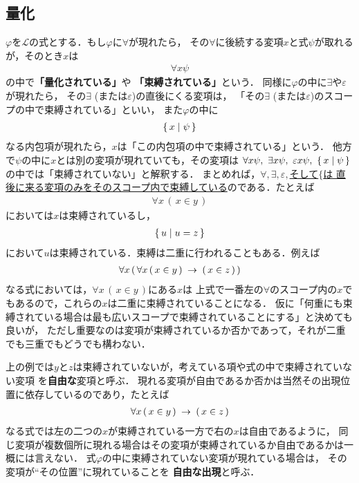 \subsection{量化}
	$\varphi$を$\mathcal{L}$の式とする．もし$\varphi$に$\forall$が現れたら，
	その$\forall$に後続する変項$x$と式$\psi$が取れるが，そのとき$x$は
	\begin{align}
		\forall x \psi
	\end{align}
	の中で{\bf 「量化されている」}や
	{\bf 「束縛されている」}という．
	同様に$\varphi$の中に$\exists$や$\varepsilon$が現れたら，
	その$\exists$ (または$\varepsilon$)の直後にくる変項は，
	「その$\exists$ (または$\varepsilon$)のスコープの中で束縛されている」といい，
	また$\varphi$の中に
	\begin{align}
		\{\, x \mid \psi\, \}
	\end{align}
	なる内包項が現れたら，$x$は「この内包項の中で束縛されている」という．
	他方で$\psi$の中に$x$とは別の変項が現れていても，その変項は
	$\forall x \psi,\ \exists x \psi,\ \varepsilon x \psi,\ \{\, x \mid \psi\, \}$
	の中では「束縛されていない」と解釈する．
	まとめれば，\underline{$\forall,\exists,\varepsilon,$そして$\{$は
	直後に来る変項のみをそのスコープ内で束縛している}のである．たとえば
	\begin{align}
		\forall x\, (\, x \in y\, )
	\end{align}
	においては$x$は束縛されているし，
	\begin{align}
		\{\, u \mid u = z\, \}
	\end{align}
	において$u$は束縛されている．束縛は二重に行われることもある．例えば
	\begin{align}
		\forall x\, (\, \forall x\, (\, x \in y\, ) \hspace{0.25em}\rightarrow\hspace{0.25em} (\, x \in z\, )\, )
	\end{align}
	なる式においては，$\forall x\, (\, x \in y\, )$にある$x$は
	上式で一番左の$\forall$のスコープ内の$x$でもあるので，これらの$x$は二重に束縛されていることになる．
	仮に「何重にも束縛されている場合は最も広いスコープで束縛されていることにする」と決めても良いが，
	ただし重要なのは変項が束縛されているか否かであって，それが二重でも三重でもどうでも構わない．
	
	上の例では$y$と$z$は束縛されていないが，考えている項や式の中で束縛されていない変項
	を{\bf 自由な}変項と呼ぶ．
	現れる変項が自由であるか否かは当然その出現位置に依存しているのであり，たとえば
	\begin{align}
		\forall x\, (\, x \in y\, ) \hspace{0.25em}\rightarrow\hspace{0.25em} (\, x \in z\, )
	\end{align}
	なる式では左の二つの$x$が束縛されている一方で右の$x$は自由であるように，
	同じ変項が複数個所に現れる場合はその変項が束縛されているか自由であるかは一概には言えない．
	式$\varphi$の中に束縛されていない変項が現れている場合は，
	その変項が``その位置''に現れていることを
	{\bf 自由な出現}と呼ぶ．
	
